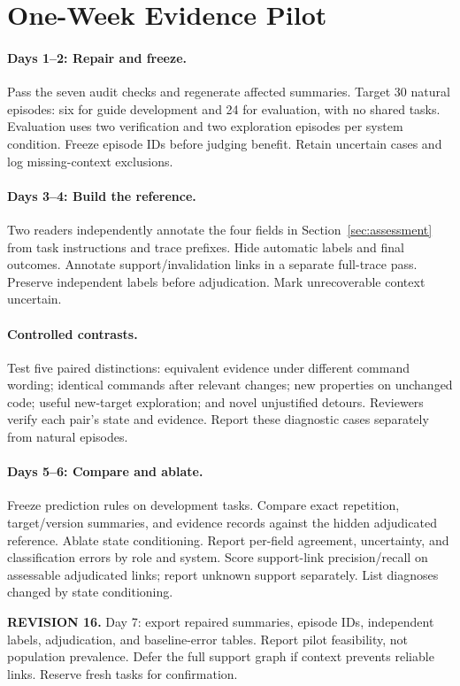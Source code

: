 \documentclass[10pt,a4paper,twocolumn]{article}
\newcommand{\rev}[2]{\par\smallskip\noindent\begin{minipage}{\linewidth}\color{revision}\footnotesize\textbf{REVISION #1.} #2\end{minipage}\par\smallskip}
\begin{document}
\section{One-Week Evidence Pilot}\label{app:revision}
\paragraph{Days 1--2: Repair and freeze.}
Pass the seven audit checks and regenerate affected summaries. Target 30 natural episodes: six for guide development and 24 for evaluation, with no shared tasks. Evaluation uses two verification and two exploration episodes per system condition. Freeze episode IDs before judging benefit. Retain uncertain cases and log missing-context exclusions.

\paragraph{Days 3--4: Build the reference.}
Two readers independently annotate the four fields in Section~\ref{sec:assessment} from task instructions and trace prefixes. Hide automatic labels and final outcomes. Annotate support/invalidation links in a separate full-trace pass. Preserve independent labels before adjudication. Mark unrecoverable context uncertain.

\paragraph{Controlled contrasts.}
Test five paired distinctions: equivalent evidence under different command wording; identical commands after relevant changes; new properties on unchanged code; useful new-target exploration; and novel unjustified detours. Reviewers verify each pair's state and evidence. Report these diagnostic cases separately from natural episodes.

\paragraph{Days 5--6: Compare and ablate.}
Freeze prediction rules on development tasks. Compare exact repetition, target/version summaries, and evidence records against the hidden adjudicated reference. Ablate state conditioning. Report per-field agreement, uncertainty, and classification errors by role and system. Score support-link precision/recall on assessable adjudicated links; report unknown support separately. List diagnoses changed by state conditioning.

\rev{16}{Day 7: export repaired summaries, episode IDs, independent labels, adjudication, and baseline-error tables. Report pilot feasibility, not population prevalence. Defer the full support graph if context prevents reliable links. Reserve fresh tasks for confirmation.}
\end{document}
